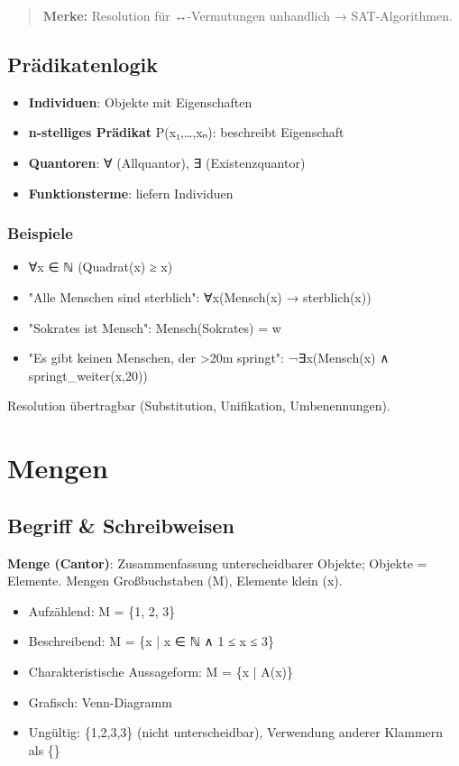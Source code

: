 \documentclass[11pt, a4paper]{article}
\begin{document}
\begin{quote}
\textbf{Merke:} Resolution für ↔-Vermutungen unhandlich → SAT-Algorithmen.
\end{quote}


\subsection{Prädikatenlogik}

\begin{itemize}
  \item \textbf{Individuen}: Objekte mit Eigenschaften
  \item \textbf{n-stelliges Prädikat} P(x₁,…,xₙ): beschreibt Eigenschaft
  \item \textbf{Quantoren}: ∀ (Allquantor), ∃ (Existenzquantor)
  \item \textbf{Funktionsterme}: liefern Individuen
\end{itemize}


\subsubsection{Beispiele}
\begin{itemize}
  \item ∀x ∈ ℕ (Quadrat(x) ≥ x)
  \item "Alle Menschen sind sterblich": ∀x(Mensch(x) → sterblich(x))
  \item "Sokrates ist Mensch": Mensch(Sokrates) = w
  \item "Es gibt keinen Menschen, der >20m springt": ¬∃x(Mensch(x) ∧ springt\_weiter(x,20))
\end{itemize}

Resolution übertragbar (Substitution, Unifikation, Umbenennungen).



\section{Mengen}


\subsection{Begriff \& Schreibweisen}

\textbf{Menge (Cantor)}: Zusammenfassung unterscheidbarer Objekte; Objekte = Elemente. Mengen Großbuchstaben (M), Elemente klein (x).


\begin{itemize}
  \item Aufzählend: M = \{1, 2, 3\}
  \item Beschreibend: M = \{x | x ∈ ℕ ∧ 1 ≤ x ≤ 3\}
  \item Charakteristische Aussageform: M = \{x | A(x)\}
  \item Grafisch: Venn-Diagramm
  \item Ungültig: \{1,2,3,3\} (nicht unterscheidbar), Verwendung anderer Klammern als \{\}
\end{itemize}
\end{document}
